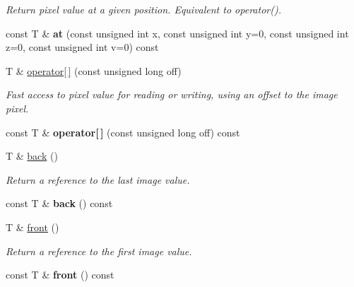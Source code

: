 \begin{DoxyCompactItemize}
\begin{DoxyCompactList}\small\item\em Return pixel value at a given position. Equivalent to operator(). \end{DoxyCompactList}\item 
\hypertarget{structcimg__library_1_1_c_img_a3b4ec7bd0b96430eabefa9d4289d7dad}{const T \& {\bfseries at} (const unsigned int x, const unsigned int y=0, const unsigned int z=0, const unsigned int v=0) const }\label{structcimg__library_1_1_c_img_a3b4ec7bd0b96430eabefa9d4289d7dad}

\item 
T \& \hyperlink{structcimg__library_1_1_c_img_a53ee85b82244ff16acd428e5ad655540}{operator\mbox{[}$\,$\mbox{]}} (const unsigned long off)
\begin{DoxyCompactList}\small\item\em Fast access to pixel value for reading or writing, using an offset to the image pixel. \end{DoxyCompactList}\item 
\hypertarget{structcimg__library_1_1_c_img_a836f6f9d882f3263ba512a722cb39f4a}{const T \& {\bfseries operator\mbox{[}$\,$\mbox{]}} (const unsigned long off) const }\label{structcimg__library_1_1_c_img_a836f6f9d882f3263ba512a722cb39f4a}

\item 
\hypertarget{structcimg__library_1_1_c_img_a9fe3b98715c7e946498a301a273fa25b}{T \& \hyperlink{structcimg__library_1_1_c_img_a9fe3b98715c7e946498a301a273fa25b}{back} ()}\label{structcimg__library_1_1_c_img_a9fe3b98715c7e946498a301a273fa25b}

\begin{DoxyCompactList}\small\item\em Return a reference to the last image value. \end{DoxyCompactList}\item 
\hypertarget{structcimg__library_1_1_c_img_a921255b74ea293d61b022dca4143d105}{const T \& {\bfseries back} () const }\label{structcimg__library_1_1_c_img_a921255b74ea293d61b022dca4143d105}

\item 
\hypertarget{structcimg__library_1_1_c_img_a8b0a55d72dc695fe935d6a900e469364}{T \& \hyperlink{structcimg__library_1_1_c_img_a8b0a55d72dc695fe935d6a900e469364}{front} ()}\label{structcimg__library_1_1_c_img_a8b0a55d72dc695fe935d6a900e469364}

\begin{DoxyCompactList}\small\item\em Return a reference to the first image value. \end{DoxyCompactList}\item 
\hypertarget{structcimg__library_1_1_c_img_a5da999a2ec95ab6f967ec61d0310f5dd}{const T \& {\bfseries front} () const }\label{structcimg__library_1_1_c_img_a5da999a2ec95ab6f967ec61d0310f5dd}


\end{DoxyCompactItemize}
